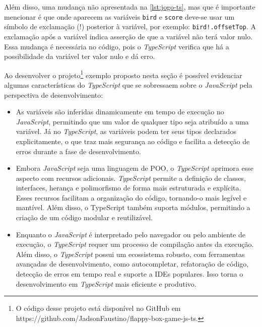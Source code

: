 Além disso, uma mudança não apresentada na \autoref{lst:jogo-ts}, mas que é importante mencionar é que onde aparecem as variáveis \texttt{bird} e \texttt{score} deve-se usar um símbolo de exclamação (!) posterior à variável, por exemplo: \texttt{bird!.offsetTop}. A exclamação após a variável indica asserção de que a variável não terá valor nulo. Essa mudança é necessária no código, pois o \textit{TypeScript} verifica que há a possibilidade da variável ter valor nulo e dá erro.

Ao desenvolver o projeto\footnote{O código desse projeto está disponível no GitHub em https://github.com/JadsonFaustino/flappy-box-game-js-ts.} exemplo proposto nesta seção é possível evidenciar algumas características do \textit{TypeScript} que se sobressaem sobre o \textit{JavaScript} pela perspectiva de desenvolvimento:
\begin{itemize}
    \item As variáveis são inferidas dinamicamente em tempo de execução no \textit{JavaScript}, permitindo que um valor de qualquer tipo seja atribuído a uma variável. Já no \textit{TypeScript}, as variáveis podem ter seus tipos declarados explicitamente, o que traz mais segurança ao código e facilita a detecção de erros durante a fase de desenvolvimento.

    \item Embora \textit{JavaScript} seja uma linguagem de POO, o \textit{TypeScript} aprimora esse aspecto com recursos adicionais. \textit{TypeScript} permite a definição de classes, interfaces, herança e polimorfismo de forma mais estruturada e explícita. Esses recursos facilitam a organização do código, tornando-o mais legível e mantível. Além disso, o TypeScript também suporta módulos, permitindo a criação de um código modular e reutilizável.

    \item Enquanto o \textit{JavaScript} é interpretado pelo navegador ou pelo ambiente de execução, o \textit{TypeScript} requer um processo de compilação antes da execução. Além disso, o \textit{TypeScript} possui um ecossistema robusto, com ferramentas avançadas de desenvolvimento, como autocompletar, refatoração de código, detecção de erros em tempo real e suporte a IDEs populares. Isso torna o desenvolvimento em \textit{TypeScript} mais eficiente e produtivo.
\end{itemize}

